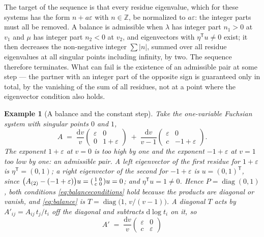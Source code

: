 \documentclass[11pt]{article}
\newcommand{\eps}{\varepsilon}
\newcommand{\dd}{\mathrm{d}}
\newcommand{\Z}{\mathbb{Z}}
\newtheorem{example}[definition]{Example}
\begin{document}
The target of the sequence is that every residue eigenvalue, which
for these systems has the form $n + a\eps$ with $n \in \Z$, be
normalized to $a\eps$: the integer parts must all be removed.  A
balance is admissible when $\lambda$ has integer part $n_1 > 0$ at
$v_1$ and $\mu$ has integer part $n_2 < 0$ at $v_2$, and eigenvectors
with $\eta^{\mathsf T}u \neq 0$ exist; it then decreases the
non-negative integer $\sum \lvert n \rvert$, summed over all residue
eigenvalues at all singular points including infinity, by two.  The
sequence therefore terminates.  What can fail is the existence of an
admissible pair at some step --- the partner with an integer part of
the opposite sign is guaranteed only in total, by the vanishing of
the sum of all residues, not at a point where the eigenvector
condition also holds.

\begin{example}[A balance and the constant step]
\label{ex:balance}
Take the one-variable Fuchsian system with singular points $0$ and
$1$,
\begin{equation}
  A \;=\; \frac{\dd v}{v}
  \begin{pmatrix} \eps & 0\\ 0 & 1+\eps\end{pmatrix}
  \;+\;
  \frac{\dd v}{v-1}
  \begin{pmatrix} \eps & 0\\ c & -1+\eps\end{pmatrix} .
\end{equation}
The exponent $1+\eps$ at $v=0$ is too high by one and the exponent
$-1+\eps$ at $v=1$ too low by one: an admissible pair.  A left
eigenvector of the first residue for $1+\eps$ is
$\eta^{\mathsf T} = (0,1)$; a right eigenvector of the second for
$-1+\eps$ is $u = (0,1)^{\mathsf T}$, since
$\big(A_{(2)}-(-1+\eps)\big)u = \begin{psmallmatrix}1&0\\c&0
\end{psmallmatrix}u = 0$; and $\eta^{\mathsf T}u = 1 \neq 0$.  Hence
$P = \operatorname{diag}(0,1)$, both conditions
\eqref{eq:balanceconditions} hold because the products are diagonal
or vanish, and \eqref{eq:balance} is
$T = \operatorname{diag}\big(1,\, v/(v-1)\big)$.  A diagonal $T$ acts
by $A'_{ij} = A_{ij}\,t_j/t_i$ off the diagonal and subtracts
$\dd\log t_i$ on it, so
\begin{equation}
  A' \;=\; \frac{\dd v}{v}
  \begin{pmatrix} \eps & 0\\ c & \eps\end{pmatrix}

\end{equation}
\end{example}
\end{document}
